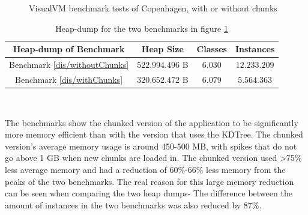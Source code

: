 \begin{figure}[ht]%
  \centering
  \caption{VisualVM benchmark tests of Copenhagen, with or without chunks}\label{kbhBench}
\end{figure}
\begin{table}[ht]
  \centering
  \begin{tabular}{ c|c|c|c }
   \textbf{Heap-dump of Benchmark} & \textbf{Heap Size} & \textbf{Classes} & \textbf{Instances}\\
   \hline
   Benchmark \ref{dis/withoutChunks} & $522.994.496$ B & $6.030$ & $12.233.209$ \\
   Benchmark \ref{dis/withChunks} & $320.652.472$ B & $6.079$ & $5.564.363$ \\
  \end{tabular}\\
  \caption{\centering Heap-dump for the two benchmarks in figure \ref{kbhBench}}\label{KDTree/timeComplexity}
\end{table}
The benchmarks show the chunked version of the application to be significantly more memory efficient than with the version that uses the KDTree. The chunked version's average memory usage is around 450-500 MB, with spikes that do not go above 1 GB when new chunks are loaded in. The chunked version used >75\% less average memory and had a reduction of 60\%-66\% less memory from the peaks of the two benchmarks. The real reason for this large memory reduction can be seen when comparing the two heap dumps- The difference between the amount of instances in the two benchmarks was also reduced by 87\%. 
